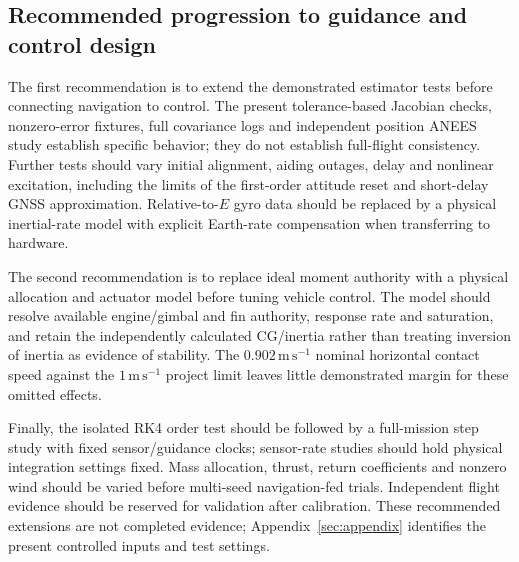 \subsection{Recommended progression to guidance and control design}
The first recommendation is to extend the demonstrated estimator tests before connecting navigation to control. The present tolerance-based Jacobian checks, nonzero-error fixtures, full covariance logs and independent position ANEES study establish specific behavior; they do not establish full-flight consistency. Further tests should vary initial alignment, aiding outages, delay and nonlinear excitation, including the limits of the first-order attitude reset and short-delay GNSS approximation. Relative-to-$E$ gyro data should be replaced by a physical inertial-rate model with explicit Earth-rate compensation when transferring to hardware.

The second recommendation is to replace ideal moment authority with a physical allocation and actuator model before tuning vehicle control. The model should resolve available engine/gimbal and fin authority, response rate and saturation, and retain the independently calculated CG/inertia rather than treating inversion of inertia as evidence of stability. The $0.902\,\mathrm{m\,s^{-1}}$ nominal horizontal contact speed against the $1\,\mathrm{m\,s^{-1}}$ project limit leaves little demonstrated margin for these omitted effects.

Finally, the isolated RK4 order test should be followed by a full-mission step study with fixed sensor/guidance clocks; sensor-rate studies should hold physical integration settings fixed. Mass allocation, thrust, return coefficients and nonzero wind should be varied before multi-seed navigation-fed trials. Independent flight evidence should be reserved for validation after calibration. These recommended extensions are not completed evidence; Appendix~\ref{sec:appendix} identifies the present controlled inputs and test settings.
